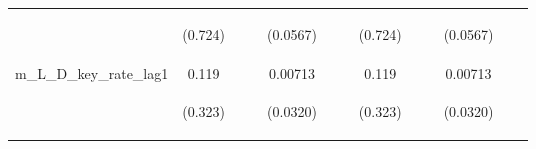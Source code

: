 \documentclass[]{article}
\begin{document}
\begin{center}
\begin{tabular}{lcccccccccccc}
\vspace{4pt} & \begin{footnotesize}(0.724)\end{footnotesize} & \begin{footnotesize}\end{footnotesize} & \begin{footnotesize}\end{footnotesize} & \begin{footnotesize}(0.0567)\end{footnotesize} & \begin{footnotesize}\end{footnotesize} & \begin{footnotesize}\end{footnotesize} & \begin{footnotesize}(0.724)\end{footnotesize} & \begin{footnotesize}\end{footnotesize} & \begin{footnotesize}\end{footnotesize} & \begin{footnotesize}(0.0567)\end{footnotesize} & \begin{footnotesize}\end{footnotesize} & \begin{footnotesize}\end{footnotesize} \\
m\_L\_D\_key\_rate\_lag1 & 0.119 &  &  & 0.00713 &  &  & 0.119 &  &  & 0.00713 &  &  \\
\vspace{4pt} & \begin{footnotesize}(0.323)\end{footnotesize} & \begin{footnotesize}\end{footnotesize} & \begin{footnotesize}\end{footnotesize} & \begin{footnotesize}(0.0320)\end{footnotesize} & \begin{footnotesize}\end{footnotesize} & \begin{footnotesize}\end{footnotesize} & \begin{footnotesize}(0.323)\end{footnotesize} & \begin{footnotesize}\end{footnotesize} & \begin{footnotesize}\end{footnotesize} & \begin{footnotesize}(0.0320)\end{footnotesize} & \begin{footnotesize}\end{footnotesize} & \begin{footnotesize}\end{footnotesize} \\

\end{tabular}
\end{center}
\end{document}
